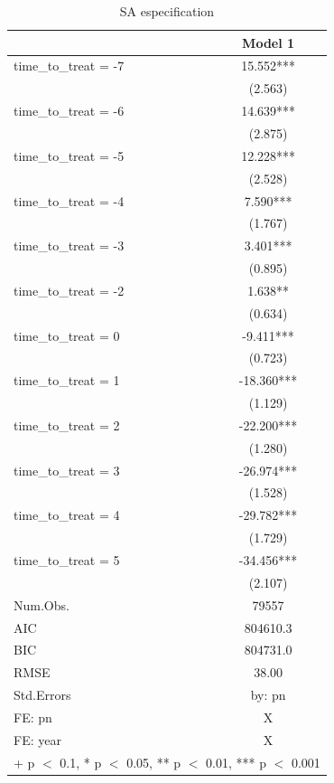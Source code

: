 \documentclass[
  12pt,
]{article}
\begin{document}
\begin{table}

\caption{\label{tab:table-4}SA especification}
\centering
\begin{tabular}[t]{lc}
\toprule
  & Model 1\\
\midrule
time\_to\_treat = -7 & 15.552***\\
 & (2.563)\\
time\_to\_treat = -6 & 14.639***\\
 & (2.875)\\
time\_to\_treat = -5 & 12.228***\\
 & (2.528)\\
time\_to\_treat = -4 & 7.590***\\
 & (1.767)\\
time\_to\_treat = -3 & 3.401***\\
 & (0.895)\\
time\_to\_treat = -2 & 1.638**\\
 & (0.634)\\
time\_to\_treat = 0 & -9.411***\\
 & (0.723)\\
time\_to\_treat = 1 & -18.360***\\
 & (1.129)\\
time\_to\_treat = 2 & -22.200***\\
 & (1.280)\\
time\_to\_treat = 3 & -26.974***\\
 & (1.528)\\
time\_to\_treat = 4 & -29.782***\\
 & (1.729)\\
time\_to\_treat = 5 & -34.456***\\
 & (2.107)\\
\midrule
Num.Obs. & 79557\\
AIC & 804610.3\\
BIC & 804731.0\\
RMSE & 38.00\\
Std.Errors & by: pn\\
FE: pn & X\\
FE: year & X\\
\bottomrule
\multicolumn{2}{l}{\rule{0pt}{1em}+ p $<$ 0.1, * p $<$ 0.05, ** p $<$ 0.01, *** p $<$ 0.001}\\
\end{tabular}
\end{table}
\end{document}
